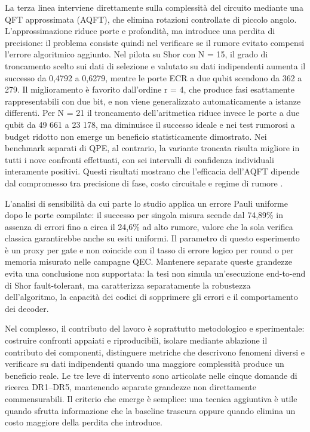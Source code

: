 La terza linea interviene direttamente sulla complessità del circuito mediante una QFT approssimata (AQFT), che elimina rotazioni controllate di piccolo angolo. L'approssimazione riduce porte e profondità, ma introduce una perdita di precisione: il problema consiste quindi nel verificare se il rumore evitato compensi l'errore algoritmico aggiunto. Nel pilota su Shor con N = 15, il grado di troncamento scelto sui dati di selezione e valutato su dati indipendenti aumenta il successo da 0,4792 a 0,6279, mentre le porte ECR a due qubit scendono da 362 a 279. Il miglioramento è favorito dall'ordine r = 4, che produce fasi esattamente rappresentabili con due bit, e non viene generalizzato automaticamente a istanze differenti. Per N = 21 il troncamento dell'aritmetica riduce invece le porte a due qubit da 49 661 a 23 178, ma diminuisce il successo ideale e nei test rumorosi a budget ridotto non emerge un beneficio statisticamente dimostrato. Nei benchmark separati di QPE, al contrario, la variante troncata risulta migliore in tutti i nove confronti effettuati, con sei intervalli di confidenza individuali interamente positivi. Questi risultati mostrano che l'efficacia dell'AQFT dipende dal compromesso tra precisione di fase, costo circuitale e regime di rumore \cite{barencoAQFT1996,akoramurthy2026}.

L'analisi di sensibilità da cui parte lo studio applica un errore Pauli uniforme dopo le porte compilate: il successo per singola misura scende dal 74,89\% in assenza di errori fino a circa il 24,6\% ad alto rumore, valore che la sola verifica classica garantirebbe anche su esiti uniformi. Il parametro di questo esperimento è un proxy per gate e non coincide con il tasso di errore logico per round o per memoria misurato nelle campagne QEC. Mantenere separate queste grandezze evita una conclusione non supportata: la tesi non simula un'esecuzione end-to-end di Shor fault-tolerant, ma caratterizza separatamente la robustezza dell'algoritmo, la capacità dei codici di sopprimere gli errori e il comportamento dei decoder.

Nel complesso, il contributo del lavoro è soprattutto metodologico e sperimentale: costruire confronti appaiati e riproducibili, isolare mediante ablazione il contributo dei componenti, distinguere metriche che descrivono fenomeni diversi e verificare su dati indipendenti quando una maggiore complessità produce un beneficio reale. Le tre leve di intervento sono articolate nelle cinque domande di ricerca DR1--DR5, mantenendo separate grandezze non direttamente commensurabili. Il criterio che emerge è semplice: una tecnica aggiuntiva è utile quando sfrutta informazione che la baseline trascura oppure quando elimina un costo maggiore della perdita che introduce.

